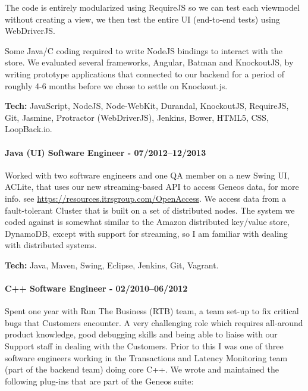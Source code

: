 \documentclass[
  a4paper,
]{article}
\begin{document}
\begin{multicols*}{2}
The code is entirely modularized using RequireJS so we can test each
viewmodel without creating a view, we then test the entire UI
(end-to-end tests) using WebDriverJS.

Some Java/C coding required to write NodeJS bindings to interact with
the store. We evaluated several frameworks, Angular, Batman and
KnockoutJS, by writing prototype applications that connected to our
backend for a period of roughly 4-6 months before we chose to settle on
Knockout.js.

\textbf{Tech:} JavaScript, NodeJS, Node-WebKit, Durandal, KnockoutJS,
RequireJS, Git, Jasmine, Protractor (WebDriverJS), Jenkins, Bower,
HTML5, CSS, LoopBack.io.

\hypertarget{java-ui-software-engineer---072012122013}{%
\paragraph{Java (UI) Software Engineer -
07/2012--12/2013}\label{java-ui-software-engineer---072012122013}}

Worked with two software engineers and one QA member on a new Swing UI,
ACLite, that uses our new streaming-based API to access Geneos data, for
more info. see \url{https://resources.itrsgroup.com/OpenAccess}. We
access data from a fault-tolerant Cluster that is built on a set of
distributed nodes. The system we coded against is somewhat similar to
the Amazon distributed key/value store, DynamoDB, except with support
for streaming, so I am familiar with dealing with distributed systems.

\textbf{Tech:} Java, Maven, Swing, Eclipse, Jenkins, Git, Vagrant.

\hypertarget{c-software-engineer---022010062012}{%
\paragraph{C++ Software Engineer -
02/2010--06/2012}\label{c-software-engineer---022010062012}}

Spent one year with Run The Business (RTB) team, a team set-up to fix
critical bugs that Customers encounter. A very challenging role which
requires all-around product knowledge, good debugging skills and being
able to liaise with our Support staff in dealing with the Customers.
Prior to this I was one of three software engineers working in the
Transactions and Latency Monitoring team (part of the backend team)
doing core C++. We wrote and maintained the following plug-ins that are
part of the Geneos suite:


\end{multicols*}
\end{document}
